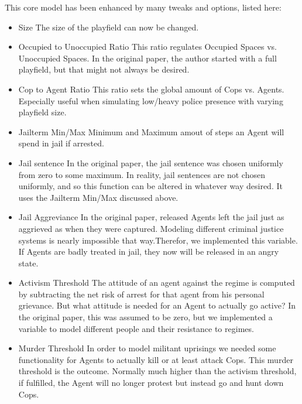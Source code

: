 \documentclass[11pt]{article}
\begin{document}
This core model has been enhanced by many tweaks and options, listed here:
\begin{itemize}
\item Size\newline
The size of the playfield can now be changed.

\item Occupied to Unoccupied Ratio\newline     
This ratio regulates Occupied Spaces vs. Unoccupied Spaces. In the original paper, the author started with a full playfield, but that might not always be desired.

\item Cop to Agent Ratio\newline    
This ratio sets the global amount of Cops vs. Agents. Especially useful when simulating low/heavy police presence with varying playfield size.

\item Jailterm Min/Max\newline          
Minimum and Maximum amout of steps an Agent will spend in jail if arrested.

\item Jail sentence\newline
In the original paper, the jail sentence was chosen uniformly from zero to some maximum. In reality, jail sentences are not chosen uniformly, and so this function can be altered in whatever way desired. It uses the Jailterm Min/Max discussed above.

\item Jail Aggreviance\newline
In the original paper, released Agents left the jail just as aggrieved as when they were captured. Modeling different criminal justice systems is nearly impossible that way.Therefor, we implemented this variable. If Agents are badly treated in jail, they now will be released in an angry state.

\item Activism Threshold\newline
The attitude of an agent against the regime is computed by subtracting the net risk of arrest for that agent from his personal grievance. But what attitude is needed for an Agent to actually go active? In the original paper, this was assumed to be zero, but we implemented a variable to model different people and their resistance to regimes.

\item Murder Threshold\newline
In order to model militant uprisings we needed some functionality for Agents to actually kill or at least attack Cops. This murder threshold is the outcome. Normally much higher than the activism threshold, if fulfilled, the Agent will no longer protest but instead go and hunt down Cops.


\end{itemize}
\end{document}
